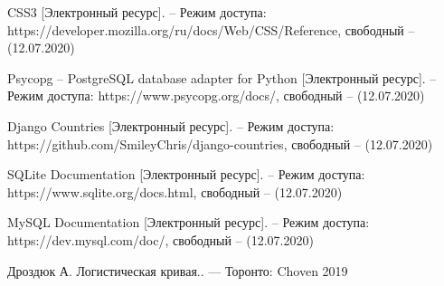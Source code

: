 \documentclass[a4paper,14pt]{extarticle}
\begin{document}
\begin{thebibliography}{19}
 		CSS3 [Электронный ресурс]. – Режим доступа: 
 		https://developer.mozilla.org/ru/docs/Web/CSS/Reference, 
 		свободный – (12.07.2020)
 		
 		Psycopg – PostgreSQL database adapter for Python [Электронный ресурс]. – Режим доступа: 
 		https://www.psycopg.org/docs/, 
 		свободный – (12.07.2020)
 		
 		Django Countries [Электронный ресурс]. – Режим доступа: 
 		https://github.com/SmileyChris/django-countries, 
 		свободный – (12.07.2020)
 		
 		SQLite Documentation [Электронный ресурс]. – Режим доступа: 
 		https://www.sqlite.org/docs.html, 
 		свободный – (12.07.2020)
 		
 		MySQL Documentation [Электронный ресурс]. – Режим доступа: 
 		https://dev.mysql.com/doc/, 
 		свободный – (12.07.2020)
 		
 		Дроздюк А. Логистическая кривая.. — Торонто: Choven 2019
 	\end{thebibliography}
 	
 
\end{document}
